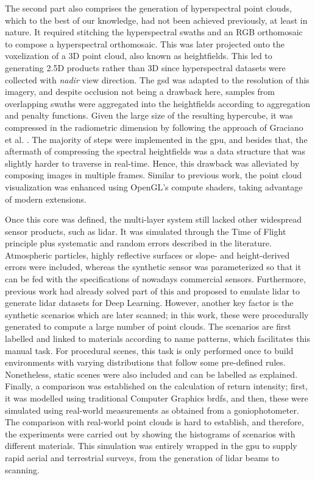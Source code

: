 The second part also comprises the generation of hyperspectral point clouds, which to the best of our knowledge, had not been achieved previously, at least in nature. It required stitching the hyperspectral swaths and an RGB orthomosaic to compose a hyperspectral orthomosaic. This was later projected onto the voxelization of a 3D point cloud, also known as heightfields. This led to generating 2.5D products rather than 3D since hyperspectral datasets were collected with \textit{nadir} view direction. The \acrshort{gsd} was adapted to the resolution of this imagery, and despite occlusion not being a drawback here, samples from overlapping swaths were aggregated into the heightfields according to aggregation and penalty functions. Given the large size of the resulting hypercube, it was compressed in the radiometric dimension by following the approach of Graciano et al. \cite{graciano_real-time_2018}. The majority of steps were implemented in the \acrshort{gpu}, and besides that, the aftermath of compressing the spectral heightfields was a data structure that was slightly harder to traverse in real-time. Hence, this drawback was alleviated by composing images in multiple frames. Similar to previous work, the point cloud visualization was enhanced using OpenGL's compute shaders, taking advantage of modern extensions.

Once this core was defined, the multi-layer system still lacked other widespread sensor products, such as \acrshort{lidar}. It was simulated through the Time of Flight principle plus systematic and random errors described in the literature. Atmospheric particles, highly reflective surfaces or slope- and height-derived errors were included, whereas the synthetic sensor was parameterized so that it can be fed with the specifications of nowadays commercial sensors. Furthermore, previous work had already solved part of this and proposed to emulate \acrshort{lidar} to generate \acrshort{lidar} datasets for Deep Learning. However, another key factor is the synthetic scenarios which are later scanned; in this work, these were procedurally generated to compute a large number of point clouds. The scenarios are first labelled and linked to materials according to name patterns, which facilitates this manual task. For procedural scenes, this task is only performed once to build environments with varying distributions that follow some pre-defined rules. Nonetheless, static scenes were also included and can be labelled as explained. Finally, a comparison was established on the calculation of return intensity; first, it was modelled using traditional Computer Graphics \acrshort{brdf}s, and then, these were simulated using real-world measurements as obtained from a goniophotometer. The comparison with real-world point clouds is hard to establish, and therefore, the experiments were carried out by showing the histograms of scenarios with different materials. This simulation was entirely wrapped in the \acrshort{gpu} to supply rapid aerial and terrestrial surveys, from the generation of \acrshort{lidar} beams to scanning.

